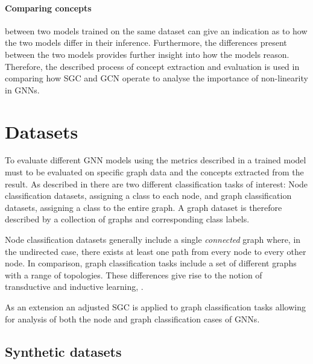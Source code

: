 \paragraph{Comparing concepts} between two models trained on the same dataset can give an indication as to how the two models differ in their inference.
Furthermore, the differences present between the two models provides further insight into how the models reason.
Therefore, the described process of concept extraction and evaluation is used in comparing how SGC and GCN operate to analyse the importance of non-linearity in GNNs.  

\section{Datasets}
\label{sec:datasets-theory}


To evaluate different GNN models using the metrics described in  a trained model must to be evaluated on specific graph data and the concepts extracted from the result.
As described in  there are two different classification tasks of interest:
Node classification datasets, assigning a class to each node, and graph classification datasets, assigning a class to the entire graph.
A graph dataset is therefore described by a collection of graphs and corresponding class labels.

Node classification datasets generally include a single \emph{connected} graph where, in the undirected case, there exists at least one path from every node to every other node.
In comparison, graph classification tasks include a set of different graphs with a range of topologies.
These differences give rise to the notion of transductive and inductive learning, .

As an extension an adjusted SGC is applied to graph classification tasks allowing for analysis of both the node and graph classification cases of GNNs.

\subsection{Synthetic datasets}
\label{sec:synth}


